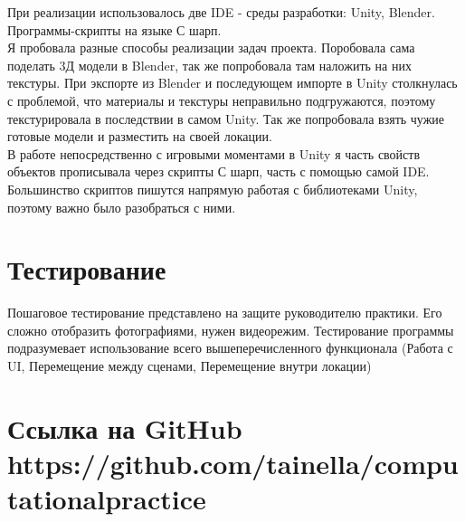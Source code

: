 \documentclass[dvipsnames, pdf, unicode, 12pt, a4paper, oneside, fleqn]{article}
\begin{document}
При реализации использовалось две IDE - среды разработки: Unity, Blender. Программы-скрипты на языке С шарп. \\
Я пробовала разные способы реализации задач проекта. Поробовала сама поделать 3Д модели в Blender, так же попробовала там наложить на них текстуры. При экспорте из Blender и последующем импорте в Unity столкнулась с проблемой, что материалы и текстуры неправильно подгружаются, поэтому текстурировала в последствии в самом Unity. Так же попробовала взять чужие готовые модели и разместить на своей локации. \\
В работе непосредственно с игровыми моментами в Unity я часть свойств объектов прописывала через скрипты С шарп, часть с помощью самой IDE. Большинство скриптов пишутся напрямую работая с библиотеками Unity, поэтому важно было разобраться с ними. 
\section*{Тестирование}
Пошаговое тестирование представлено на защите руководителю практики. Его сложно отобразить фотографиями, нужен видеорежим. Тестирование программы подразумевает использование всего вышеперечисленного функционала (Работа с UI, Перемещение между сценами, Перемещение внутри локации)

\section*{Ссылка на GitHub \\ https://github.com/tainella/computationalpractice}
\pagebreak
\end{document}
